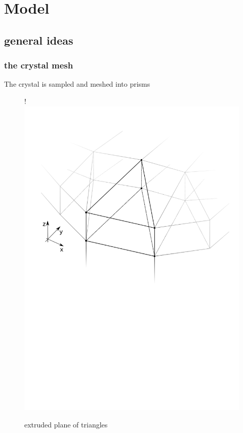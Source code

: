 \section{Model}

\subsection{general ideas}

\subsubsection{the crystal mesh}

The crystal is sampled and meshed into prisms

\begin{itemize}

    \begin{figure}[H]
      \centerline{
         {!} {\includegraphics{graphics/delauny_3.png}}
      }
      \caption{extruded plane of triangles}
      \label{graphic:extruded_mesh}
    \end{figure}


\end{itemize}
